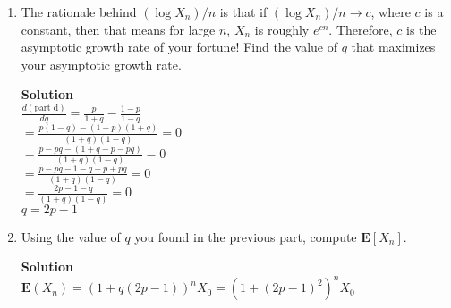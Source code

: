 \documentclass[11pt]{article}
\newenvironment{Parts}{\begin{enumerate}[label=(\alph*)]}{\end{enumerate}}
\newcommand*{\Part}{\item}
\newenvironment{Answer}{\vspace{10pt}\begin{mdframed}\textbf{Solution}\\}{\end{mdframed}\vfill\pagebreak[3]}
\newenvironment{Answer}{\vspace{10pt}}{\vfill\pagebreak[3]}
\newcommand*{\E}{\textbf{E}}
\begin{document}
\begin{Parts}
  \Part The rationale behind $(\log X_n)/n$ is that if $(\log X_n)/n \to c$, where $c$ is a constant, then that means for large $n$, $X_n$ is roughly $e^{cn}$. Therefore, $c$ is the asymptotic growth rate of your fortune! Find the value of $q$ that maximizes your asymptotic growth rate.
  \begin{Answer}
$\frac{d(\text{part d})}{dq}=\frac{p}{1+q}-\frac{1-p}{1-q}$\\
$=\frac{p(1-q)-(1-p)(1+q)}{(1+q)(1-q)}=0$\\
$=\frac{p-pq-(1+q-p-pq)}{(1+q)(1-q)}=0$\\
$=\frac{p-pq-1-q+p+pq}{(1+q)(1-q)}=0$\\
$=\frac{2p-1-q}{(1+q)(1-q)}=0$\\
$q=2p-1$
  \end{Answer}
  
  \Part Using the value of $q$ you found in the previous part, compute $\E[X_n]$.
  \begin{Answer}
$\E(X_n)=(1+q(2p-1))^nX_0=(1+(2p-1)^2)^nX_0$
  \end{Answer}
\end{Parts}
\end{document}
